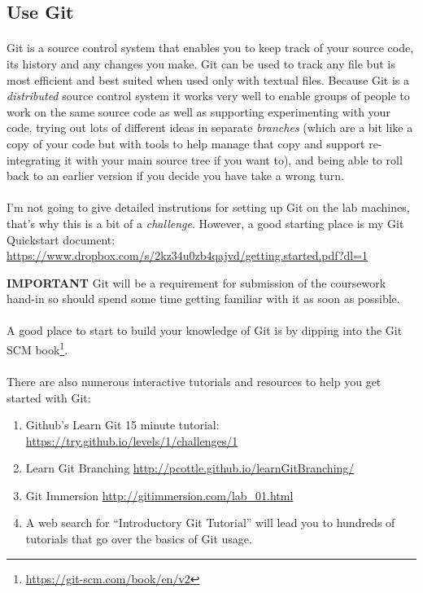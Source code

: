 \documentclass[10pt, a4paper]{article}
\begin{document}
\subsection{Use Git}
\paragraph{} Git is a source control system that enables you to keep track of your source code, its history and any changes you make. Git can be used to track any file but is most efficient and best suited when used only with textual files. Because Git is a \emph{distributed} source control system it works very well to enable groups of people to work on the same source code as well as supporting experimenting with your code, trying out lots of different ideas in separate \emph{branches} (which are a bit like a copy of your code but with tools to help manage that copy and support re-integrating it with your main source tree if you want to), and being able to roll back to an earlier version if you decide you have take a wrong turn.

\paragraph{} I'm not going to give detailed instrutions for setting up Git on the lab machines, that's why this is a bit of a \emph{challenge}. However, a good starting place is my Git Quickstart document: \url{https://www.dropbox.com/s/2kz34u0zb4qajvd/getting.started.pdf?dl=1}

\begin{framed}
{\textbf{IMPORTANT} Git will be a requirement for submission of the coursework hand-in so should spend some time getting familiar with it as soon as possible.}
\end{framed}

\paragraph{} A good place to start to build your knowledge of Git is by dipping into the Git SCM book\footnote{\url{https://git-scm.com/book/en/v2}}.

\paragraph{} There are also numerous interactive tutorials and resources to help you get started with Git:
\begin{enumerate}
\item Github's Learn Git 15 minute tutorial: \url{https://try.github.io/levels/1/challenges/1}
\item Learn Git Branching \url{http://pcottle.github.io/learnGitBranching/}
\item Git Immersion \url{http://gitimmersion.com/lab_01.html}
\item A web search for ``Introductory Git Tutorial'' will lead you to hundreds of tutorials that go over the basics of Git usage.
\end{enumerate}
\end{document}
